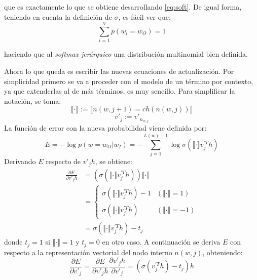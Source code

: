 que es exactamente lo que se obtiene desarrollando \ref{eq:soft}. De igual forma, teniendo en cuenta la definición de $\sigma$, es fácil ver que:
\begin{equation}
  \sum_{i=1}^Vp\left( w_i = w_O \right) = 1
\end{equation}

haciendo que al \textit{softmax jerárquico} una distribución multinomial bien definida.

Ahora lo que queda es escribir las nuevas ecuaciones de actualización. Por simplicidad primero se va a proceder con el modelo de un término por contexto, ya que extenderlas
al de más términos, es muy sencillo. Para simplificar la notación, se toma:
\begin{equation}
  \llbracket \cdot \rrbracket := \llbracket  n(w, j+1) = ch(n(w,j)) \rrbracket
\end{equation}
\begin{equation}
  v'_j := v'_{n_{w,j}}
\end{equation}
La función de error con la nueva probabilidad viene definida por:
\begin{equation}
  E = - \log p\left( w=w_O|w_I \right) = - \sum_{j=1}^{L(w) - 1} \log\sigma\left( \llbracket \cdot \rrbracket v^{'T}_jh \right)
\end{equation}
Derivando $E$ respecto de $v'_jh$, se obtiene:
\begin{align}
  \frac{\partial E}{\partial v'_j h} & = \left( \sigma\left( \llbracket \cdot \rrbracket v^{'T}_jh \right) \right) \llbracket \cdot \rrbracket \\
                                     & = \begin{cases}
                                      \sigma\left( \llbracket \cdot \rrbracket v^{'T}_jh \right) - 1 & (\llbracket \cdot \rrbracket = 1) \\
                                      \sigma\left( \llbracket \cdot \rrbracket v^{'T}_jh \right) & (\llbracket \cdot \rrbracket = -1)
                                    \end{cases} \\
                                    & = \sigma\left( \llbracket \cdot \rrbracket v^{'T}_jh \right) - t_j
\end{align}
donde $t_j=1$ si $\llbracket \cdot \rrbracket = 1$ y $t_j=0$ en otro caso. A continuación se deriva $E$ con respecto a la representación vectorial del nodo interno $n(w,j)$, obteniendo:
\begin{equation}
  \frac{\partial E}{\partial v'_j} = \frac{\partial E}{\partial v'_j h} \frac{\partial v'_jh}{\partial v'_j} = \left( \sigma\left( v^{'T}_j h \right) - t_j \right) h
\end{equation}
